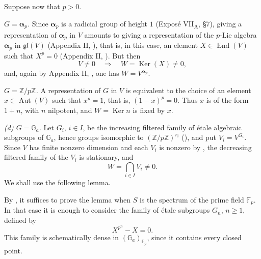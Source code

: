Suppose now that \(p>0\).

\textit{ \(G=\boldsymbol\alpha_p\).}
Since \(\boldsymbol\alpha_p\) is a radicial group of height \(1\)
(Exposé VII\textsubscript{A}, \S7), giving a representation of
\(\boldsymbol\alpha_p\) in \(V\) amounts to giving a representation
of the \(p\)-Lie algebra \(\boldsymbol\alpha_p\) in
\(\mathfrak{gl}(V)\) (Appendix II, ), that is, in this case, an
element \(X\in\operatorname{End}(V)\) such that \(X^p=0\)
(Appendix II, ).  But then
\[
  V\ne0\quad\Longrightarrow\quad
  W=\operatorname{Ker}(X)\ne0,
\]
and, again by Appendix II, , one has
\(W=V^{\boldsymbol\alpha_p}\).

\textit{ \(G=\mathbb Z/p\mathbb Z\).}
A representation of \(G\) in \(V\) is equivalent to the choice of an
element \(x\in\operatorname{Aut}(V)\) such that \(x^p=1\), that is,
\((1-x)^p=0\).  Thus \(x\) is of the form \(1+n\), with \(n\)
nilpotent, and \(W=\operatorname{Ker}n\) is fixed by \(x\).

\textit{(d) \(G=\mathbb G_a\).}
Let \(G_i\), \(i\in I\), be the increasing filtered family of étale
algebraic subgroups of \(\mathbb G_a\), hence groups isomorphic to
\((\mathbb Z/p\mathbb Z)^{r_i}\) (), and put
\(V_i=V^{G_i}\).  Since \(V\) has finite nonzero dimension and each
\(V_i\) is nonzero by , the decreasing filtered family of the
\(V_i\) is stationary, and
\[
  W=\bigcap_{i\in I}V_i\ne0.
\]
We shall use the following lemma.


By , it suffices to prove the lemma when \(S\) is the
spectrum of the prime field \(\mathbb F_p\).  In that case it is
enough to consider the family of étale subgroups \(G_n\), \(n\geq1\),
defined by
\[
  X^{p^n}-X=0.
\]
This family is schematically dense in
\((\mathbb G_a)_{\mathbb F_p}\), since it contains every closed point.

